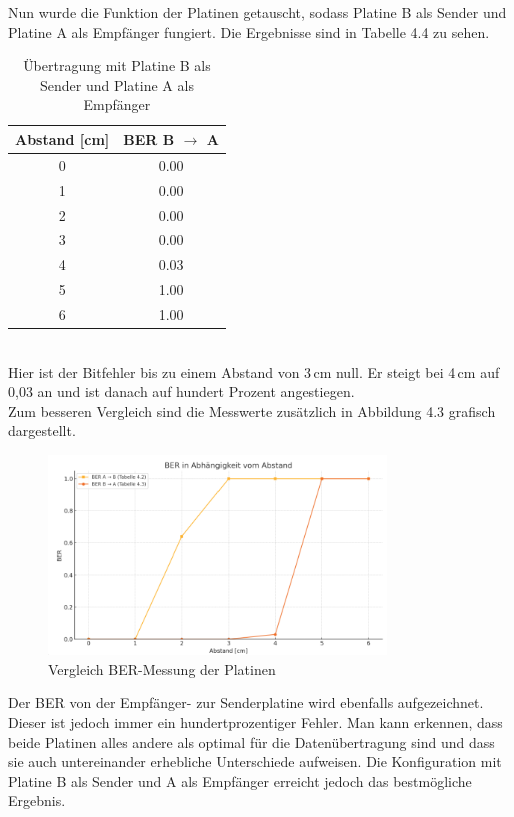 Nun wurde die Funktion der Platinen getauscht, sodass Platine B als Sender und Platine A als Empfänger fungiert. Die Ergebnisse
sind in Tabelle 4.4 zu sehen.
\begin{table}[h!]
    \centering
        \begin{tabular}{c|c}
            Abstand [cm] & BER B $\rightarrow$ A \\
            \hline
             0 & 0.00 \\
            \hline
             1 & 0.00 \\
            \hline
             2 & 0.00 \\
            \hline
             3 & 0.00 \\
            \hline
             4 & 0.03 \\
            \hline
             5 & 1.00 \\
            \hline
             6 & 1.00 \\
        \end{tabular}
        \caption{Übertragung mit Platine B als Sender und Platine A als Empfänger}
    \end{table}
    \\
    
Hier ist der Bitfehler bis zu einem Abstand von 3\,cm null. Er steigt bei 4\,cm auf 0,03 an und ist
danach auf hundert Prozent angestiegen.\\
Zum besseren Vergleich sind die Messwerte zusätzlich in Abbildung 4.3 grafisch dargestellt.

\begin{figure}[H]
    \centering
    \includegraphics[width=0.8\textwidth]{Pictures/diagramm.png}
    \caption{Vergleich BER-Messung der Platinen}
\end{figure}

Der BER von der Empfänger- zur Senderplatine wird ebenfalls aufgezeichnet. Dieser ist jedoch
immer ein hundertprozentiger Fehler.
Man kann erkennen, dass beide Platinen alles andere als optimal für die Datenübertragung sind und
dass sie auch untereinander erhebliche Unterschiede aufweisen. Die Konfiguration mit Platine B als Sender und A als Empfänger erreicht jedoch
das bestmögliche Ergebnis.


